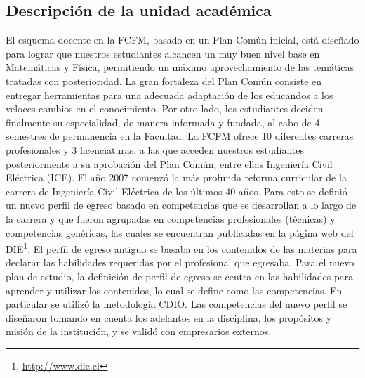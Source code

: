 
\subsection{Descripción de la unidad académica}

El esquema docente en la FCFM, basado en un Plan Común inicial, está diseñado para lograr
que nuestros estudiantes alcancen un muy buen nivel base en Matemáticas y Física, permitiendo
un máximo aprovechamiento de las temáticas tratadas con posterioridad. La gran fortaleza del
Plan Común consiste en entregar herramientas para una adecuada adaptación de los educandos
a los veloces cambios en el conocimiento. Por otro lado, los estudiantes deciden finalmente
su especialidad, de manera informada y fundada, al cabo de 4 semestres de permanencia en la
Facultad. La FCFM ofrece 10 diferentes carreras profesionales y 3 licenciaturas, a las que acceden
nuestros estudiantes posteriormente a su aprobación del Plan Común, entre ellas Ingeniería Civil
Eléctrica (ICE). El año 2007 comenzó la más profunda reforma curricular de la carrera de Ingeniería
Civil Eléctrica de los últimos 40 años. Para esto se definió un nuevo perfil de egreso basado en
competencias que se desarrollan a lo largo de la carrera y que fueron agrupadas en competencias
profesionales (técnicas) y competencias genéricas, las cuales se encuentran publicadas en la página
web del DIE\footnote{\url{http://www.die.cl}}. El perfil de egreso antiguo se basaba en los contenidos de las materias para declarar
las habilidades requeridas por el profesional que egresaba. Para el nuevo plan de estudio, la
definición de perfil de egreso se centra en las habilidades para aprender y utilizar los contenidos,
lo cual se define como las competencias. En particular se utilizó la metodología CDIO. Las
competencias del nuevo perfil se diseñaron tomando en cuenta los adelantos en la disciplina, los
propósitos y misión de la institución, y se validó con empresarios externos.

